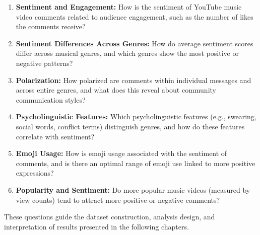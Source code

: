 \begin{enumerate}
    \item \textbf{Sentiment and Engagement:}  
    How is the sentiment of YouTube music video comments related to audience engagement, such as the number of likes the comments receive?

    \item \textbf{Sentiment Differences Across Genres:}  
    How do average sentiment scores differ across musical genres, and which genres show the most positive or negative patterns?

    \item \textbf{Polarization:}  
    How polarized are comments within individual messages and across entire genres, and what does this reveal about community communication styles?

    \item \textbf{Psycholinguistic Features:}  
    Which psycholinguistic features (e.g., swearing, social words, conflict terms) distinguish genres, and how do these features correlate with sentiment?

    \item \textbf{Emoji Usage:}  
    How is emoji usage associated with the sentiment of comments, and is there an optimal range of emoji use linked to more positive expressions?

    \item \textbf{Popularity and Sentiment:}  
    Do more popular music videos (measured by view counts) tend to attract more positive or negative comments?

\end{enumerate}

These questions guide the dataset construction, analysis design, and interpretation of results presented in the following chapters.
